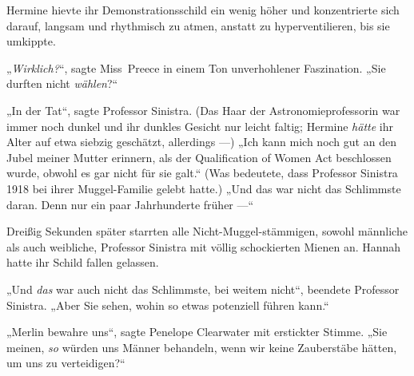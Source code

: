 Hermine hievte ihr Demonstrationsschild ein wenig höher und konzentrierte sich darauf, langsam und rhythmisch zu atmen, anstatt zu hyperventilieren, bis sie umkippte.

„\emph{Wirklich?}“, sagte Miss~Preece in einem Ton unverhohlener Faszination.
„Sie durften nicht \emph{wählen}?“

„In der Tat“, sagte Professor Sinistra. (Das Haar der Astronomieprofessorin war immer noch dunkel und ihr dunkles Gesicht nur leicht faltig; Hermine \emph{hätte} ihr Alter auf etwa siebzig geschätzt, allerdings —)
„Ich kann mich noch gut an den Jubel meiner Mutter erinnern, als der Qualification of Women Act beschlossen wurde, obwohl es gar nicht für sie galt.“ (Was bedeutete, dass Professor Sinistra 1918 bei ihrer Muggel-Familie gelebt hatte.)
„Und das war nicht das Schlimmste daran. Denn nur ein paar Jahrhunderte früher —“

Dreißig Sekunden später starrten alle Nicht-Muggel-stämmigen, sowohl männliche als auch weibliche, Professor Sinistra mit völlig schockierten Mienen an. Hannah hatte ihr Schild fallen gelassen.

„Und \emph{das} war auch nicht das Schlimmste, bei weitem nicht“, beendete Professor Sinistra.
„Aber Sie sehen, wohin so etwas potenziell führen kann.“

„Merlin bewahre uns“, sagte Penelope Clearwater mit erstickter Stimme.
„Sie meinen, \emph{so} würden uns Männer behandeln, wenn wir keine Zauberstäbe hätten, um uns zu verteidigen?“

